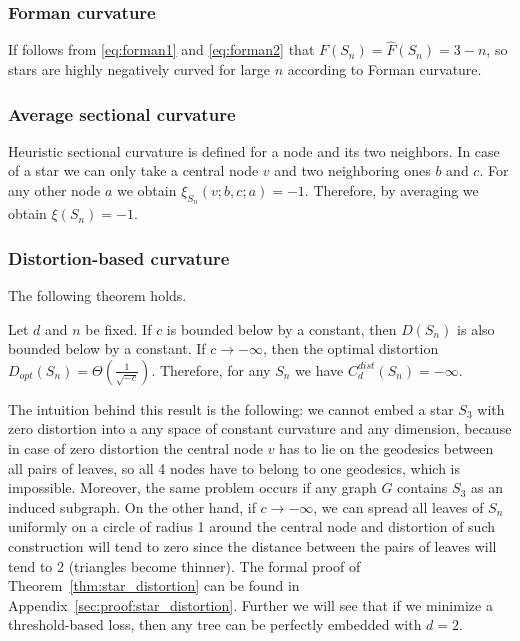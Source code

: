\documentclass[runningheads]{llncs}
\newcommand{\ch}[1]{{\color{red} #1}}
\begin{document}
\subsubsection{Forman curvature}
If follows from \eqref{eq:forman1} and \eqref{eq:forman2} that
$F(S_n) = \hat F(S_n) = 3-n$, so stars are highly negatively curved for large $n$ according to Forman curvature.

\subsubsection{Average sectional curvature}

Heuristic sectional curvature is defined for a node and its two neighbors. In case of a star we can only take a central node $v$ and two neighboring ones $b$ and $c$. For any other node $a$ we obtain $\xi_{S_n}(v;b,c;a) = -1$. Therefore, by averaging we obtain $\xi(S_n) = -1$.

\subsubsection{Distortion-based curvature} 
The following theorem holds.

\begin{theorem}\label{thm:star_distortion}
Let $d$ and $n$ be fixed.
If $c$ is bounded below by a constant, then $D(S_n)$ is also bounded below by a constant. 
If $c \to -\infty$, then the optimal distortion $D_{opt}(S_n) = \Theta\left(\frac{1}{\sqrt{-c}}\right)$.
Therefore, for any $S_n$ we have $C_d^{dist}(S_n) = -\infty$.
\end{theorem}

The intuition behind this result is the following: we cannot embed a star $S_3$ with zero distortion into a \ch{any space of constant curvature} and any dimension, because in case of zero distortion the central node $v$ has to lie on the geodesics between all pairs of leaves, so all 4 nodes have to belong to one geodesics, which is impossible. Moreover, the same problem occurs if any graph $G$ contains $S_3$ as an induced subgraph.
On the other hand, if $c \to -\infty$, we can spread all leaves of $S_n$ uniformly on a circle of radius 1 around the central node and distortion of such construction will tend to zero since the distance between the pairs of leaves will tend to 2 (triangles become thinner). 
The formal proof of Theorem~\ref{thm:star_distortion} can be found in Appendix~\ref{sec:proof:star_distortion}.
Further we will see that if we minimize a threshold-based loss, then any tree can be perfectly embedded with $d = 2$.
\end{document}
